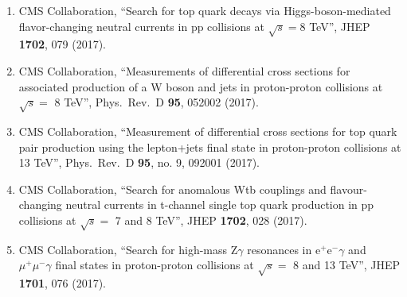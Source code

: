 \begin{enumerate}
\item CMS Collaboration, ``Search for top quark decays via Higgs-boson-mediated flavor-changing neutral currents in pp collisions at $ \sqrt{s}=8 $ TeV'', JHEP {\bf 1702}, 079 (2017).

\item CMS Collaboration, ``Measurements of differential cross sections for associated production of a W boson and jets in proton-proton collisions at $\sqrt{s} =$ 8 TeV'', Phys.\ Rev.\ D {\bf 95}, 052002 (2017).

\item CMS Collaboration, ``Measurement of differential cross sections for top quark pair production using the lepton+jets final state in proton-proton collisions at 13 TeV'', Phys.\ Rev.\ D {\bf 95}, no. 9, 092001 (2017).

\item CMS Collaboration, ``Search for anomalous Wtb couplings and flavour-changing neutral currents in t-channel single top quark production in pp collisions at $\sqrt{s} =$ 7 and 8 TeV'', JHEP {\bf 1702}, 028 (2017).

\item CMS Collaboration, ``Search for high-mass Z$\gamma$ resonances in $\mathrm{ e }^{+}\mathrm{ e }^{-}\gamma $ and $ \mu^{+}\mu^{-}\gamma$ final states in proton-proton collisions at $\sqrt{s} =$ 8 and 13 TeV'', JHEP {\bf 1701}, 076 (2017).


\end{enumerate}
